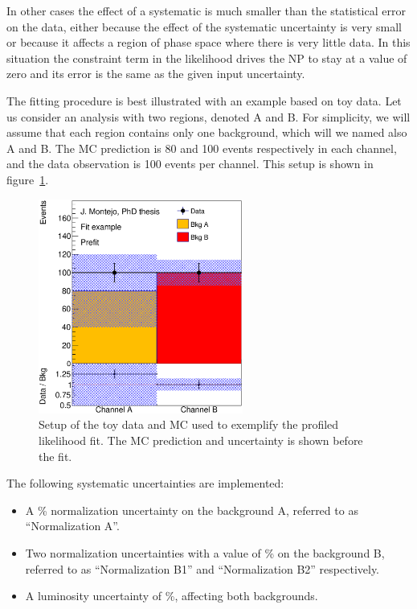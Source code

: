    In other cases the effect of a systematic is much smaller than the statistical error on the data, either because the effect of the systematic uncertainty is very small or because it affects a region of phase space where there is very little data. In this situation the constraint term in the likelihood drives the NP to stay at a value of zero and its error is the same as the given input uncertainty. 

   The fitting procedure is best illustrated with an example based on toy data. Let us consider an analysis with two regions, denoted A and B. For simplicity, we will assume that each region contains only one background, which will we named also A and B. The MC prediction is 80 and 100 events respectively in each channel, and the data observation is 100 events per channel. This setup is shown in figure~\ref{fig:toy_prefit}.
   \begin{figure}[tb!]
     \centering
     \includegraphics[width=0.6\textwidth]{Statistics/Figures/fitexample/hist_AB_prefit.eps}
     \caption{Setup of the toy data and MC used to exemplify the profiled likelihood fit. The MC prediction and uncertainty is shown before the fit. }
     \label{fig:toy_prefit}
   \end{figure}

   The following systematic uncertainties are implemented:
   \begin{itemize}
     \item A \unit[50]{\%} normalization uncertainty on the background A, referred to as ``Normalization A''.
     \item Two normalization uncertainties with a value of \unit[10]{\%} on the background B, referred to as ``Normalization B1'' and ``Normalization B2'' respectively.
     \item A luminosity uncertainty of \unit[1]{\%}, affecting both backgrounds.
   \end{itemize}

